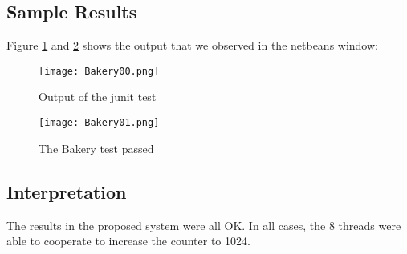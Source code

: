 \subsection{Sample Results}
Figure \ref{fig:bakery00} and \ref{fig:bakery01} shows the output that we observed in the netbeans window:
\par
\begin{figure}[h]
  \centering
  \texttt{[image: Bakery00.png]}
  \caption{Output of the junit test}
  \label{fig:bakery00}
\end{figure}
\par
\begin{figure}[h]
  \centering
  \texttt{[image: Bakery01.png]}
  \caption{The Bakery test passed}
  \label{fig:bakery01}
\end{figure}
\subsection{Interpretation}
\par
The results in the proposed system were all OK. In all cases, the  8 threads were
able to cooperate to increase the counter to 1024.
